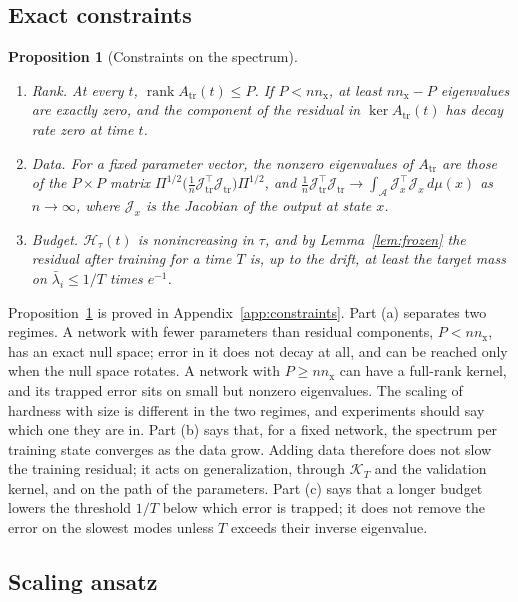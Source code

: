 \documentclass[11pt]{article}
\newtheorem{proposition}{Proposition}
\theoremstyle{definition}
\theoremstyle{remark}
\newcommand{\Aset}{\mathcal{A}}
\newcommand{\Hard}{\mathcal{H}}
\newcommand{\tr}{\mathrm{tr}}
\newcommand{\Kmap}{\mathcal{K}}
\newcommand{\Jac}{\mathcal{J}}
\begin{document}
\subsection{Exact constraints}

\begin{proposition}[Constraints on the spectrum]\label{prop:constraints}
\begin{enumerate}[label=(\alph*)]
\item \emph{Rank.} At every $t$, $\operatorname{rank}A_\tr(t) \le P$. If $P < nn_{\mathrm x}$, at least $nn_{\mathrm x} - P$ eigenvalues are exactly zero, and the component of the residual in $\ker A_\tr(t)$ has decay rate zero at time $t$.
\item \emph{Data.} For a fixed parameter vector, the nonzero eigenvalues of $A_\tr$ are those of the $P\times P$ matrix $\Pi^{1/2}\big(\tfrac1n\Jac_\tr^\top\Jac_\tr\big)\Pi^{1/2}$, and $\tfrac1n\Jac_\tr^\top\Jac_\tr \to \int_\Aset \Jac_x^\top\Jac_x\,d\mu(x)$ as $n \to \infty$, where $\Jac_x$ is the Jacobian of the output at state $x$.
\item \emph{Budget.} $\Hard_\tau(t)$ is nonincreasing in $\tau$, and by Lemma~\ref{lem:frozen} the residual after training for a time $T$ is, up to the drift, at least the target mass on $\bar\lambda_i \le 1/T$ times $e^{-1}$.
\end{enumerate}
\end{proposition}

Proposition~\ref{prop:constraints} is proved in Appendix~\ref{app:constraints}.
Part (a) separates two regimes.
A network with fewer parameters than residual components, $P < nn_{\mathrm x}$, has an exact null space; error in it does not decay at all, and can be reached only when the null space rotates.
A network with $P \ge nn_{\mathrm x}$ can have a full-rank kernel, and its trapped error sits on small but nonzero eigenvalues.
The scaling of hardness with size is different in the two regimes, and experiments should say which one they are in.
Part (b) says that, for a fixed network, the spectrum per training state converges as the data grow.
Adding data therefore does not slow the training residual; it acts on generalization, through $\Kmap_T$ and the validation kernel, and on the path of the parameters.
Part (c) says that a longer budget lowers the threshold $1/T$ below which error is trapped; it does not remove the error on the slowest modes unless $T$ exceeds their inverse eigenvalue.

\subsection{Scaling ansatz}
\end{document}
